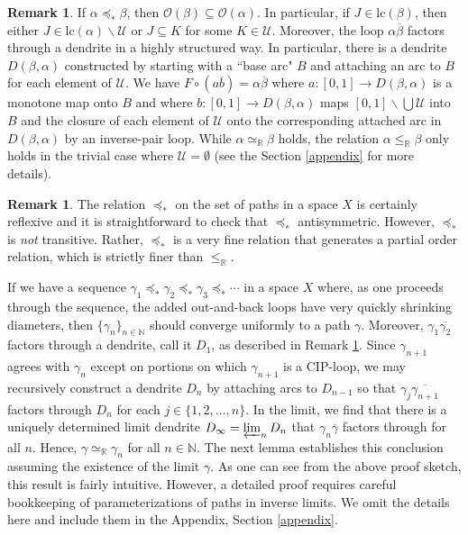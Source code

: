 \documentclass[12pt, leqno]{amsart}
\newcommand{\ord}{\preceq_{\ast}}
\newcommand{\ui}{[0,1]}
\newcommand{\den}{\simeq_{\bbr}}
\newcommand{\mco}{\mathcal{O}}
\newcommand{\scru}{\mathscr{U}}
\newcommand{\bbn}{\mathbb{N}}
\newcommand{\bbr}{\mathbb{R}}
\newcommand{\ov}{\overline}
\newcommand{\lc}{\text{lc}}
\theoremstyle{definition}\newtheorem{definition}[theorem]{Definition}
\newtheorem{remark}[theorem]{Remark}
\begin{document}
\begin{remark}\label{extremark}
If $\alpha\ord\beta$, then $\mco(\beta)\subseteq \mco(\alpha)$. In particular, if $J\in \lc(\beta)$, then either $J\in \lc(\alpha)\backslash\scru$ or $J\subseteq K$ for some $K\in\scru$. Moreover, the loop $\alpha\ov{\beta}$ factors through a dendrite in a highly structured way. In particular, there is a dendrite $D(\beta,\alpha)$ constructed by starting with a ``base arc" $B$ and attaching an arc to $B$ for each element of $\scru$. We have $F\circ (a\ov{b})=\alpha\ov{\beta}$ where $a:\ui\to D(\beta,\alpha)$ is a monotone map onto $B$ and where $b:\ui\to D(\beta,\alpha)$ maps $\ui\backslash\bigcup\scru$ into $B$ and the closure of each element of $\scru$ onto the corresponding attached arc in $D(\beta,\alpha)$ by an inverse-pair loop. While $\alpha\den\beta$ holds, the relation $\alpha\leq_{\bbr}\beta$ only holds in the trivial case where $\scru=\emptyset$ (see the Section \ref{appendix} for more details).
\end{remark}

\begin{remark}
The relation $\ord$ on the set of paths in a space $X$ is certainly reflexive and it is straightforward to check that $\ord$ antisymmetric. However, $\ord$ is \textit{not} transitive. Rather, $\ord$ is a very fine relation that generates a partial order relation, which is strictly finer than $\leq_{\bbr}$.
\end{remark}

If we have a sequence $\gamma_1\ord\gamma_{2}\ord \gamma_{3}\ord\cdots$ in a space $X$ where, as one proceeds through the sequence, the added out-and-back loops have very quickly shrinking diameters, then $\{\gamma_{n}\}_{n\in\bbn}$ should converge uniformly to a path $\gamma$. Moreover, $\gamma_1\ov{\gamma_{2}}$ factors through a dendrite, call it $D_1$, as described in Remark \ref{extremark}. Since $\gamma_{n+1}$ agrees with $\gamma_{n}$ except on portions on which $\gamma_{n+1}$ is a CIP-loop, we may recursively construct a dendrite $D_n$ by attaching arcs to $D_{n-1}$ so that $\gamma_j\ov{\gamma_{n+1}}$ factors through $D_{n}$ for each $j\in\{1,2,\dots,n\}$. In the limit, we find that there is a uniquely determined limit dendrite $D_{\infty}=\varprojlim_{n}D_n$ that $\gamma_{n}\ov{\gamma}$ factors through for all $n$. Hence, $\gamma\den\gamma_n$ for all $n\in\bbn$. The next lemma establishes this conclusion assuming the existence of the limit $\gamma$. As one can see from the above proof sketch, this result is fairly intuitive. However, a detailed proof requires careful bookkeeping of parameterizations of paths in inverse limits. We omit the details here and include them in the Appendix, Section \ref{appendix}.
\end{document}
